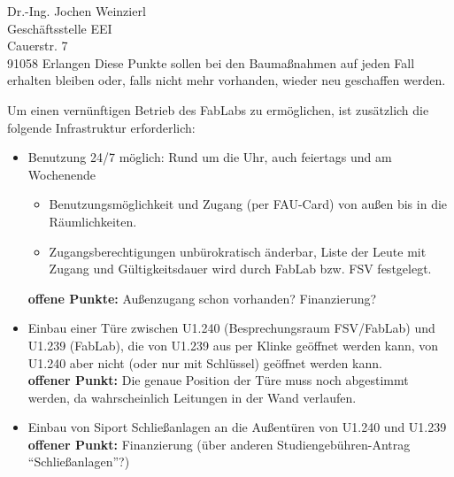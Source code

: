 \documentclass[a4paper,german]{letter}
\newcommand{\hilight}[1]{\colorbox{yellow}{#1}}
\begin{document}
\begin{letter}{Dr.-Ing. Jochen Weinzierl\\ Geschäftsstelle EEI\\ Cauerstr. 7\\ 91058 Erlangen}
Diese Punkte sollen bei den Baumaßnahmen auf jeden Fall erhalten bleiben oder, falls nicht mehr vorhanden, wieder neu geschaffen werden.

\newpage
Um einen vernünftigen Betrieb des FabLabs zu ermöglichen, ist zusätzlich die folgende Infrastruktur erforderlich:
\begin{itemize}

\item Benutzung 24/7 möglich: Rund um die Uhr, auch feiertags und am Wochenende
	\begin{itemize}
	\item Benutzungsmöglichkeit und Zugang (per FAU-Card) von außen bis in die Räumlichkeiten.
	\item Zugangsberechtigungen unbürokratisch änderbar, Liste der Leute mit Zugang und Gültigkeitsdauer wird durch FabLab bzw. FSV festgelegt.\\
	\end{itemize}


\textbf{offene Punkte:} Außenzugang schon vorhanden? Finanzierung?
\item Einbau einer Türe zwischen U1.240 (Besprechungsraum FSV/FabLab) und U1.239 (FabLab), die von U1.239 aus per Klinke geöffnet werden kann, von U1.240 aber nicht (oder nur mit Schlüssel) geöffnet werden kann. \\ \textbf{offener Punkt:} Die genaue Position der Türe muss noch abgestimmt werden, da wahrscheinlich Leitungen in der Wand verlaufen.
\item Einbau von Siport Schließanlagen an die Außentüren von U1.240 und U1.239\\
\textbf{offener Punkt:}  Finanzierung (über anderen Studiengebühren-Antrag \enquote{Schließanlagen}?)


\end{itemize}
\end{letter}
\end{document}
